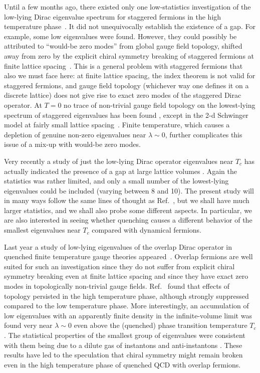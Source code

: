 \documentclass[11pt]{article}
\newcommand{\noi}{\vspace{12pt}\noindent}
\begin{document}
\noi
Until a few months ago, 
there existed only one low-statistics investigation of the
low-lying Dirac eigenvalue spectrum for staggered fermions in the high 
temperature phase~\cite{KLS}. It did not unequivocally 
establish the existence of a gap. For example, some low
eigenvalues were found. However, they could possibly
be attributed to ``would-be zero
modes'' from global gauge field topology, shifted away from zero by the
explicit chiral symmetry breaking of staggered fermions at finite
lattice spacing~\cite{Vink}. This is a general problem with staggered
fermions that also we must face here: 
at finite lattice spacing, the index theorem is not valid for 
staggered fermions, and
gauge field topology (whichever way one defines it on a discrete lattice)
does not give rise to exact zero modes of the staggered Dirac
operator. At $T=0$ no
trace of non-trivial gauge field topology on the lowest-lying
spectrum of staggered eigenvalues has been found \cite{DHNR}, except
in the 2-d Schwinger model at fairly small lattice
spacing~\cite{FHL}. Finite temperature,
which causes a depletion of genuine non-zero eigenvalues near 
$\lambda \sim 0$, further complicates this issue of a mix-up with 
would-be zero modes.

\noi
Very recently a study of just the
low-lying Dirac operator eigenvalues near $T_c$ has actually indicated
the presence of a gap at large lattice volumes \cite{Fetal}.
Again the statistics was rather limited, and only a small number of
the lowest-lying eigenvalues could be included (varying between 8 and 10).
The present
study will in many ways follow the same lines of thought as Ref.~\cite{Fetal},
but we shall have much larger statistics, and we shall also probe some
different aspects. In particular, we are also interested in seeing
whether quenching causes a different behavior of the smallest eigenvalues
near $T_c$ compared with dynamical fermions.
 
\noi
Last year a study of low-lying eigenvalues of the overlap Dirac operator
in quenched finite temperature gauge theories appeared~\cite{EHKN_fT}.
Overlap fermions are well suited for such an investigation since they
do not suffer from explicit chiral symmetry breaking even at finite lattice
spacing and since they have exact zero modes in topologically non-trivial
gauge fields. Ref.~\cite{EHKN_fT} found that effects
of topology persisted in the high temperature phase, although strongly
suppressed compared to the low temperature phase.
More interestingly, an accumulation of low eigenvalues 
with an apparently finite density in the infinite-volume limit was found
very near $\lambda\sim 0$ even above the (quenched) phase transition
temperature $T_c$.  The statistical properties of the 
smallest group of eigenvalues
were consistent with them being due to a dilute gas of instantons and
anti-instantons \cite{EHKN_fT}. These results have led to the speculation
that chiral symmetry might remain
broken even in the high temperature phase of quenched QCD with overlap
fermions. 
\end{document}
